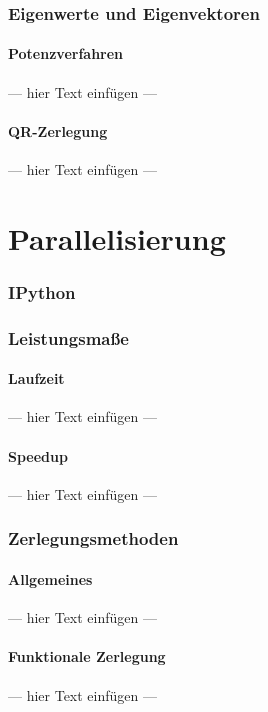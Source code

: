 \documentclass[a4paper, 12pt]{article}
\begin{document}
\begin{description}
\section{Eigenwerte und Eigenvektoren}


\subsection{Potenzverfahren}
--- hier Text einfügen ---


\subsection{QR-Zerlegung}
--- hier Text einfügen ---




\part{Parallelisierung}



\section{IPython}



\section{Leistungsmaße}


\subsection{Laufzeit}
--- hier Text einfügen ---


\subsection{Speedup}
--- hier Text einfügen ---



\section{Zerlegungsmethoden}


\subsection{Allgemeines}
--- hier Text einfügen ---


\subsection{Funktionale Zerlegung}
--- hier Text einfügen ---



\end{description}
\end{document}
